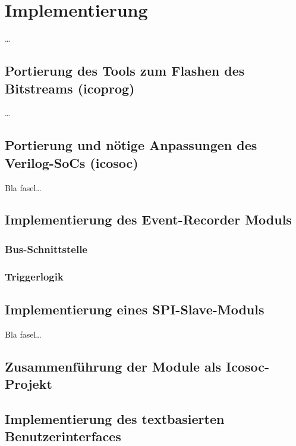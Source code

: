\chapter{Implementierung}
\label{ch:Implementierung}

\ldots

\clearpage

\section{Portierung des Tools zum Flashen des Bitstreams (icoprog)}
\label{ch:Implementierung:sec:icoprog}

\ldots
\clearpage

\section{Portierung und n\"otige Anpassungen des Verilog-SoCs (icosoc)}
\label{ch:Implementierung:sec:icosoc}

Bla fasel\ldots
\clearpage


\section{Implementierung des Event-Recorder Moduls}
\label{ch:Implementierung:sec:Event-Recorder}


\subsection{Bus-Schnittstelle}


\subsection{Triggerlogik}
\clearpage

\section{Implementierung eines SPI-Slave-Moduls}
\label{ch:Implementierung:sec:SPI-Slave}

Bla fasel\ldots
\clearpage
\section{Zusammenf\"uhrung der Module als Icosoc-Projekt}
\label{ch:Implementierung:sec:Icosoc-Projekt}

\section{Implementierung des textbasierten Benutzerinterfaces}
\label{ch:Implementierung:sec:Benutzerinterface}
\clearpage
